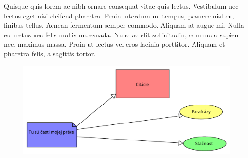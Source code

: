 \documentclass[10pt,twoside,slovak,a4paper]{article}
\begin{document}
Quisque quis lorem ac nibh ornare consequat vitae quis lectus. Vestibulum nec lectus eget nisi eleifend pharetra. Proin interdum mi tempus, posuere nisl eu, finibus tellus. Aenean fermentum semper commodo. Aliquam at augue mi. Nulla eu metus nec felis mollis malesuada. Nunc ac elit sollicitudin, commodo sapien nec, maximus massa. Proin ut lectus vel eros lacinia porttitor. Aliquam et pharetra felis, a sagittis tortor.




\begin{figure}
	\includegraphics[scale=0.4]{diagram horizontal.pdf}
\end{figure}




\newpage



\begin{figure}
	
\end{figure}
\end{document}
